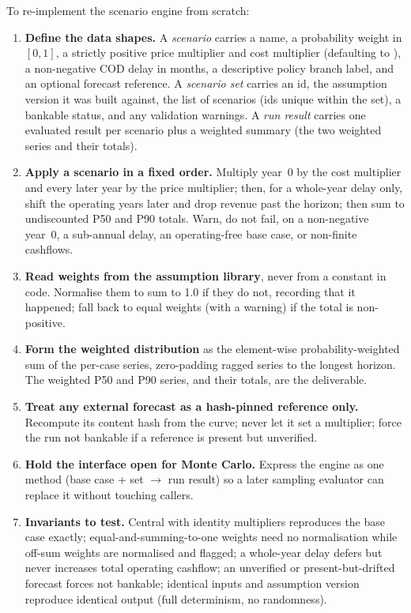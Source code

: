 \begin{rebuild}
To re-implement the scenario engine from scratch:
\begin{enumerate}
  \item \textbf{Define the data shapes.} A \emph{scenario} carries a name, a probability weight in $[0,1]$, a strictly positive price multiplier and cost multiplier (defaulting to ), a non-negative COD delay in months, a descriptive policy branch label, and an optional forecast reference. A \emph{scenario set} carries an id, the assumption version it was built against, the list of scenarios (ids unique within the set), a bankable status, and any validation warnings. A \emph{run result} carries one evaluated result per scenario plus a weighted summary (the two weighted series and their totals).
  \item \textbf{Apply a scenario in a fixed order.} Multiply year~0 by the cost multiplier and every later year by the price multiplier; then, for a whole-year delay only, shift the operating years later and drop revenue past the horizon; then sum to undiscounted P50 and P90 totals. Warn, do not fail, on a non-negative year~0, a sub-annual delay, an operating-free base case, or non-finite cashflows.
  \item \textbf{Read weights from the assumption library}, never from a constant in code. Normalise them to sum to 1.0 if they do not, recording that it happened; fall back to equal weights (with a warning) if the total is non-positive.
  \item \textbf{Form the weighted distribution} as the element-wise probability-weighted sum of the per-case series, zero-padding ragged series to the longest horizon. The weighted P50 and P90 series, and their totals, are the deliverable.
  \item \textbf{Treat any external forecast as a hash-pinned reference only.} Recompute its content hash from the curve; never let it set a multiplier; force the run not bankable if a reference is present but unverified.
  \item \textbf{Hold the interface open for Monte Carlo.} Express the engine as one method (base case + set $\rightarrow$ run result) so a later sampling evaluator can replace it without touching callers.
  \item \textbf{Invariants to test.} Central with identity multipliers reproduces the base case exactly; equal-and-summing-to-one weights need no normalisation while off-sum weights are normalised and flagged; a whole-year delay defers but never increases total operating cashflow; an unverified or present-but-drifted forecast forces not bankable; identical inputs and assumption version reproduce identical output (full determinism, no randomness).
\end{enumerate}
\end{rebuild}

